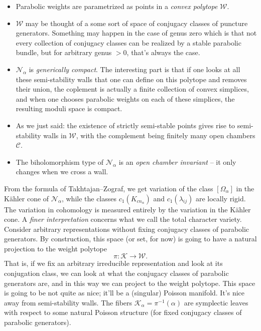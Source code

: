 \documentclass[reqno]{amsart} 
\numberwithin{theorem}{section}
\numberwithin{equation}{section}
\begin{document}
\begin{remark}
  \begin{itemize}
  \item Parabolic weights are parametrized as points in a \emph{convex polytope} $\mathcal{W}$.  
  \item $\mathcal{W}$ may be thought of a some sort of space of conjugacy classes of puncture generators.  Something may happen in the case of genus zero which is that not every collection of conjugacy classes can be realized by a stable parabolic bundle, but for arbitrary genus $> 0$, that's always the case.
  \item $\mathcal{N}_\alpha$ is \emph{generically compact}.  The interesting part is that if one looks at all these semi-stability walls that one can define on this polytope and removes their union, the coplement is actually a finite collection of convex simplices, and when one  chooses parabolic weights on each of these simplices, the resulting moduli space is compact.
  \item As we just said: the existence of strictly semi-stable points gives rise to semi-stability walls in $\mathcal{W}$, with the complement being finitely many open chambers $\mathcal{C}$.
  \item The biholomorphism type of $\mathcal{N}_\alpha$ is an \emph{open chamber invariant} -- it only changes when we cross a wall.
  \end{itemize}
\end{remark}

From the formula of Takhtajan--Zograf, we get variation of the class $[\Omega_\alpha]$ in the K\"{a}hler cone of $\mathcal{N}_\alpha$, while the classes $c_1(K_{cn_\alpha})$ and $c_1(\lambda_{i j})$ are locally rigid.  The variation in cohomology is measured entirely by the variation in the K\"{a}hler cone.  A \emph{finer interpretation} concerns what we call the total character variety.  Consider arbitrary representations without fixing conjugacy classes of parabolic generators.  By construction, this space (or set, for now) is going to have a natural projection to the weight polytope
\begin{equation*}
  \pi : \mathcal{K} \rightarrow \mathcal{W}.
\end{equation*}
That is, if we fix an arbitrary irreducible representation and look at its conjugation class, we can look at what the conjugacy classes of parabolic generators are, and in this way we can project to the weight polytope.  This space is going to be not quite as nice; it'll be a (singular) Poisson manifold.  It's nice away from semi-stability walls.  The fibers $\mathcal{K}_\alpha = \pi^{-1}(\alpha)$ are symplectic leaves with respect to some natural Poisson structure (for fixed conjugacy classes of parabolic generators).
\end{document}
